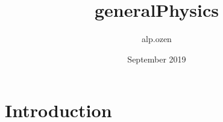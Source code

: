 \documentclass{article}
\title{generalPhysics}
\author{alp.ozen }
\date{September 2019}
\begin{document}
\maketitle

\section{Introduction}
\end{document}
